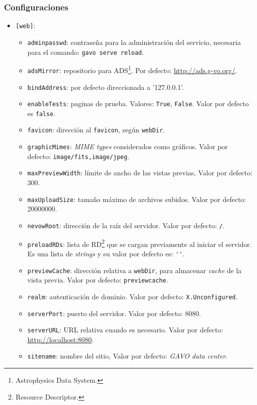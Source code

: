 \subsubsection*{Configuraciones}

\begin{itemize}
	\item \verb;[web];:
		\begin{itemize}
			\item \verb;adminpasswd;: contraseña para la administración del servicio, necesaria para el comando: \verb;gavo serve reload;.
			\item \verb;adsMirror;: repositorio para ADS\footnote{Astrophysics Data System.}. Por defecto: \url{http://ads.g-vo.org/}.
			\item \verb;bindAddress;: por defecto direccionada a  '127.0.0.1'.
			\item \verb;enableTests;: paginas de prueba. Valores: \verb;True;, \verb;False;. Valor por defecto es \verb;false;.
			\item \verb;favicon;: dirección al \verb;favicon;, según \verb;webDir;.
			\item \verb;graphicMimes;: \emph{MIME types} considerados como gráficos. Valor por defecto: \verb;image/fits,image/jpeg;.
			\item \verb;maxPreviewWidth;: límite de ancho de las vistas previas, Valor por defecto: 300.
			\item \verb;maxUploadSize;: tamaño máximo de archivos subidos. Valor por defecto: 20000000.
			\item \verb;nevowRoot;: dirección de la raíz del servidor. Valor por defecto: \verb;/;.
			\item \verb;preloadRDs;: lista de RD\footnote{Resource Descriptor.} que se cargan previamente al iniciar el servidor. Es una lista de \emph{strings} y su valor por defecto es: \verb;'';.
			\item \verb;previewCache;: dirección relativa a \verb;webDir;, para almacenar \emph{cache} de la vista previa. Valor por defecto: \verb;previewcache;.
			\item \verb;realm;: autenticación de dominio. Valor por defecto: \verb;X.Unconfigured;.
			\item \verb;serverPort;: puerto del servidor. Valor por defecto: 8080.
			\item \verb;serverURL;: URL relativa cuando es necesario. Valor por defecto: \url{http://localhost:8080}.
			\item \verb;sitename;: nombre del sitio, Valor por defecto: \emph{GAVO data center}.

\end{itemize}
\end{itemize}
